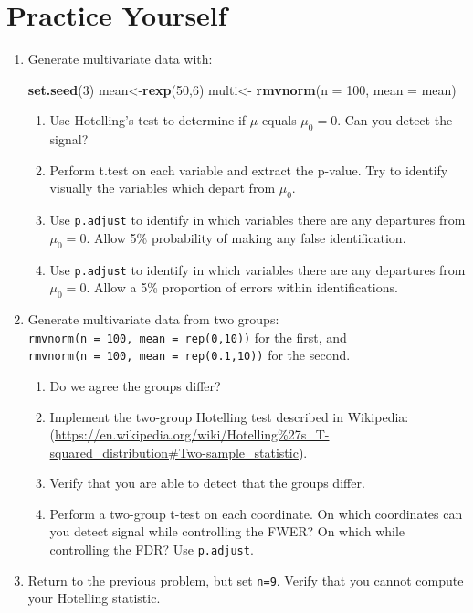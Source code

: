 \documentclass[]{book}
\newenvironment{Shaded}{\begin{snugshade}}{\end{snugshade}}
\newcommand{\KeywordTok}[1]{\textcolor[rgb]{0.13,0.29,0.53}{\textbf{#1}}}
\newcommand{\DataTypeTok}[1]{\textcolor[rgb]{0.13,0.29,0.53}{#1}}
\newcommand{\DecValTok}[1]{\textcolor[rgb]{0.00,0.00,0.81}{#1}}
\newcommand{\StringTok}[1]{\textcolor[rgb]{0.31,0.60,0.02}{#1}}
\newcommand{\NormalTok}[1]{#1}
\providecommand{\tightlist}{%
  \setlength{\itemsep}{0pt}\setlength{\parskip}{0pt}}
\theoremstyle{definition}
\theoremstyle{definition}
\theoremstyle{definition}
\theoremstyle{remark}
\begin{document}
\section{Practice Yourself}\label{practice-yourself-5}

\begin{enumerate}
\def\labelenumi{\arabic{enumi}.}
\item
  Generate multivariate data with:

\begin{Shaded}
\begin{Highlighting}[]
\KeywordTok{set.seed}\NormalTok{(}\DecValTok{3}\NormalTok{)}
\NormalTok{mean<-}\KeywordTok{rexp}\NormalTok{(}\DecValTok{50}\NormalTok{,}\DecValTok{6}\NormalTok{)}
\NormalTok{multi<-}\StringTok{  }\KeywordTok{rmvnorm}\NormalTok{(}\DataTypeTok{n =} \DecValTok{100}\NormalTok{, }\DataTypeTok{mean =}\NormalTok{ mean) }
\end{Highlighting}
\end{Shaded}

  \begin{enumerate}
  \def\labelenumii{\alph{enumii}.}
  \tightlist
  \item
    Use Hotelling's test to determine if \(\mu\) equals \(\mu_0=0\). Can
    you detect the signal?
  \item
    Perform t.test on each variable and extract the p-value. Try to
    identify visually the variables which depart from \(\mu_0\).
  \item
    Use \texttt{p.adjust} to identify in which variables there are any
    departures from \(\mu_0=0\). Allow 5\% probability of making any
    false identification.
  \item
    Use \texttt{p.adjust} to identify in which variables there are any
    departures from \(\mu_0=0\). Allow a 5\% proportion of errors within
    identifications.
  \end{enumerate}
\item
  Generate multivariate data from two groups:
  \texttt{rmvnorm(n\ =\ 100,\ mean\ =\ rep(0,10))} for the first, and
  \texttt{rmvnorm(n\ =\ 100,\ mean\ =\ rep(0.1,10))} for the second.

  \begin{enumerate}
  \def\labelenumii{\alph{enumii}.}
  \tightlist
  \item
    Do we agree the groups differ?
  \item
    Implement the two-group Hotelling test described in Wikipedia:
    (\url{https://en.wikipedia.org/wiki/Hotelling\%27s_T-squared_distribution\#Two-sample_statistic}).
  \item
    Verify that you are able to detect that the groups differ.
  \item
    Perform a two-group t-test on each coordinate. On which coordinates
    can you detect signal while controlling the FWER? On which while
    controlling the FDR? Use \texttt{p.adjust}.
  \end{enumerate}
\item
  Return to the previous problem, but set \texttt{n=9}. Verify that you
  cannot compute your Hotelling statistic.
\end{enumerate}
\end{document}
